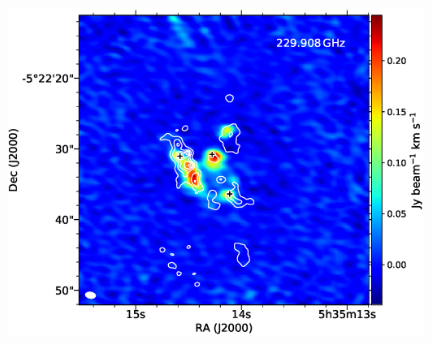 \begin{figure}[H]
\begin{center}
\begin{minipage}{0.98\textwidth}
\begin{center}
\begin{minipage}{0.48\textwidth}
\begin{center}
\includegraphics[width=0.98\textwidth]{OrionKL/mom0/229.908mom0_3-7.eps}
\end{center}
\end{minipage}
\end{center}
\end{minipage}


\end{center}
\end{figure}

